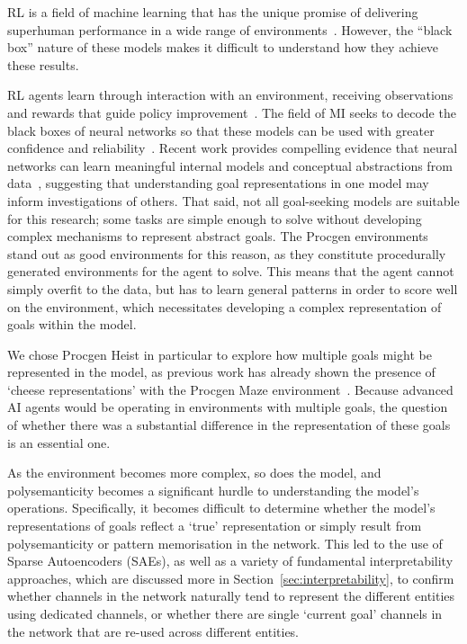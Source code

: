 RL is a field of machine learning that has the unique promise of delivering superhuman performance in a wide range of environments~\citep{silver_2016_mastering}. However, the ``black box'' nature of these models makes it difficult to understand how they achieve these results.

RL agents learn through interaction with an environment, receiving observations and rewards that guide policy improvement~\citep{sutton2018reinforcement}. The field of MI seeks to decode the black boxes of neural networks so that these models can be used with greater confidence and reliability~\citep{olah2018building}. Recent work provides compelling evidence that neural networks can learn meaningful internal models and conceptual abstractions from data~\citep{li2022emergent}, suggesting that understanding goal representations in one model may inform investigations of others. That said, not all goal-seeking models are suitable for this research; some tasks are simple enough to solve without developing complex mechanisms to represent abstract goals. The Procgen environments stand out as good environments for this reason, as they constitute procedurally generated environments for the agent to solve. This means that the agent cannot simply overfit to the data, but has to learn general patterns in order to score well on the environment, which necessitates developing a complex representation of goals within the model.

We chose Procgen Heist in particular to explore how multiple goals might be represented in the model, as previous work has already shown the presence of `cheese representations' with the Procgen Maze environment~\citep{mini_2023_understanding}. Because advanced AI agents would be operating in environments with multiple goals, the question of whether there was a substantial difference in the representation of these goals is an essential one.

As the environment becomes more complex, so does the model, and polysemanticity becomes a significant hurdle to understanding the model's operations. Specifically, it becomes difficult to determine whether the model's representations of goals reflect a `true' representation or simply result from polysemanticity or pattern memorisation in the network. This led to the use of Sparse Autoencoders (SAEs), as well as a variety of fundamental interpretability approaches, which are discussed more in Section~\ref{sec:interpretability}, to confirm whether channels in the network naturally tend to represent the different entities using dedicated channels, or whether there are single `current goal' channels in the network that are re-used across different entities.



